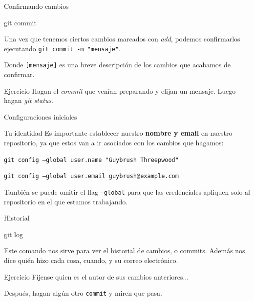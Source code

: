 \begin{frame}[t]{Confirmando cambios}
    \begin{comando}
        git commit
    \end{comando}

    \pause
    \begin{block}{}
        Una vez que tenemos ciertos cambios marcados con \textit{add}, podemos confirmarlos
        ejecutando \texttt{git commit -m "mensaje"}.

        \vspace{0.5em}

        Donde \texttt{[mensaje]} es una breve descripción de los cambios que acabamos de confirmar.
    \end{block}

    \pause
    \vspace{1em}
    \pause
    \begin{ejercicio}{Ejercicio}
        Hagan el \textit{commit} que venían preparando y elijan un mensaje. Luego hagan \textit{git status}.
    \end{ejercicio}
\end{frame}



\begin{frame}[fragile]{Configuraciones iniciales}

    \begin{block}{Tu identidad}
        Es importante establecer nuestro \textbf{nombre y email} en nuestro repositorio, ya que estos van a ir asociados con los cambios que hagamos:

        \vspace{0.5em}

        \texttt{git config --global user.name "Guybrush Threepwood"}

        \texttt{git config --global user.email guybrush@example.com}


    También se puede omitir el flag \texttt{--global} para que las credenciales apliquen solo al repositorio en el que estamos trabajando.
        \end{block}
\end{frame}

\begin{frame}{Historial}
 \begin{comando}
     git log
 \end{comando}
 \pause
 \begin{block}{}
     Este comando nos sirve para ver el historial de cambios, o commits. Además nos dice quién hizo cada cosa, cuando, y su correo electrónico.
     
 \end{block}
    \begin{ejercicio}{Ejercicio}
        Fíjense quien es el autor de sus cambios anteriores...
        
        Después, hagan algún otro \texttt{commit} y miren que pasa.
    \end{ejercicio}
\end{frame}

